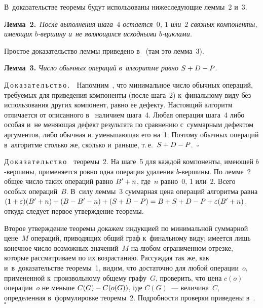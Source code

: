 \begin{multicols}{2}
  В~доказательстве теоремы будут использованы нижеследующие леммы~2 
и~3.
  
  \smallskip
  
  \noindent
  \textbf{Лемма~2.}\ \textit{После выполнения шага~$4$ остается~$0$, $1$ 
или~$2$ связных компоненты, имеющих $b$-вер\-ши\-ну и~не являющихся 
исходными $b$-цик\-лами.}
  
  Простое доказательство леммы приведено в~\cite[п.~4]{1-gor} (там это 
лемма~3). 
  
  \smallskip
  
  \noindent
  \textbf{Лемма~3.} \textit{Число обычных операций в~алгоритме равно} 
$S\hm+D\hm-P$.
  
  \smallskip
  
  \noindent
  Д\,о\,к\,а\,з\,а\,т\,е\,л\,ь\,с\,т\,в\,о\,.\ \ Напомним~\cite{2-gor}, что 
минимальное число обычных операций, требуемых для приведения компоненты 
(после шага~2) к~финальному виду без использования других компонент, равно 
ее дефекту. Настоящий алгоритм отличается от описанного в~\cite{2-gor} 
наличием шага~4. Любая операция шага~4 либо особая и~не меняющая дефект 
результата по сравнению с~суммарным дефектом аргументов, либо обычная 
и~уменьшающая его на~1. Поэтому обычных операций в~алгоритме столько же, 
сколько и~раньше, т.\,е.\ $S\hm+D\hm- P$.~$\square$
  
  \smallskip
  
  \noindent
  Д\,о\,к\,а\,з\,а\,т\,е\,л\,ь\,с\,т\,в\,о\ \ теоремы~2. На шаге~5 для каждой 
компоненты, имеющей $b$-вер\-ши\-ны, применяется ровно одна операция 
удаления $b$-вер\-ши\-ны. По лемме~2 общее число таких операций равно 
$B^\prime\hm+n$, где~$n$ равно~0, 1 или~2. Всего особых операций~$B$. 
В~силу леммы~3 суммарная цена операций алгоритма равна 
$(1\hm+\varepsilon)(B^\prime\hm+n)\hm+(B\hm- B^\prime\hm- n)\hm+(S\hm+D\hm- 
P)\hm=B\hm+S\hm+ D\hm- P\hm+\varepsilon(B^\prime \hm+n)$, откуда следует 
первое утверждение теоремы. 
  
  Второе утверждение теоремы докажем индукцией по минимальной 
суммарной цене~$M$ операций, приводящих общий граф к~финальному виду; 
имеется лишь конечное число возможных значений~$M$ на любом 
ограниченном отрезке, которые рассматриваем по их возрастанию. Рассуждая 
так же, как и~в~доказательстве теоремы~1, видим, что достаточно для любой 
операции~$o$, примененной к~произвольному общему графу~$G$, проверить, 
что цена $c(o)$ операции~$o$ не меньше $C(G)\hm- C(o(G))$, где $C(G)$~--- 
величина~$C$, определенная в~формулировке теоремы~2. Подробности 
проверки приведены в~\cite[п.~4]{1-gor}.~$\square$
  

\end{multicols}
